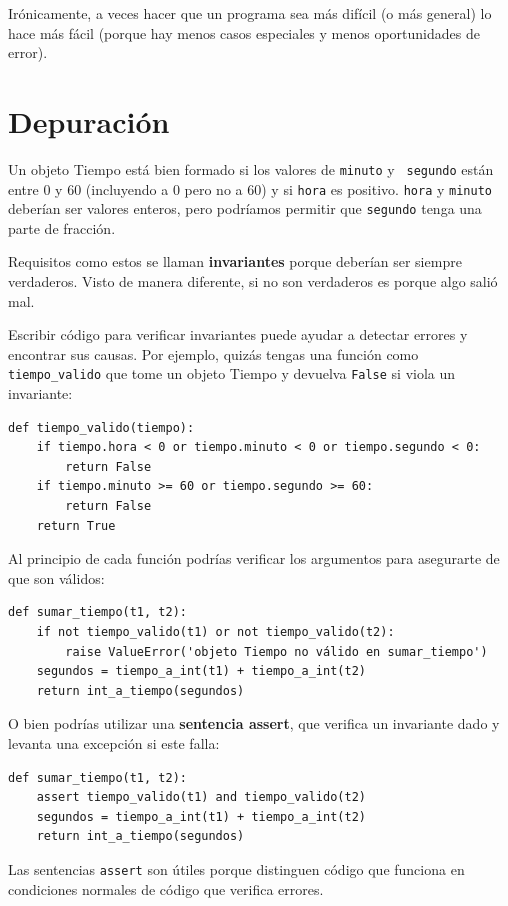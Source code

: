 \documentclass[10pt]{book}
\begin{document}
Irónicamente, a veces hacer que un programa sea más difícil (o más general) lo hace
más fácil (porque hay menos casos especiales y menos oportunidades
de error).


\section{Depuración}

Un objeto Tiempo está bien formado si los valores de {\tt minuto} y {\tt
segundo} están entre 0 y 60 (incluyendo a 0 pero no a 60) y si
{\tt hora} es positivo.  {\tt hora} y {\tt minuto} deberían ser
valores enteros, pero podríamos permitir que {\tt segundo} tenga una
parte de fracción.

Requisitos como estos se llaman {\bf invariantes} porque
deberían ser siempre verdaderos.  Visto de manera diferente, si no
son verdaderos es porque algo salió mal.

Escribir código para verificar invariantes puede ayudar a detectar errores
y encontrar sus causas.  Por ejemplo, quizás tengas una función
como \verb"tiempo_valido" que tome un objeto Tiempo y devuelva
{\tt False} si viola un invariante:

\begin{verbatim}
def tiempo_valido(tiempo):
    if tiempo.hora < 0 or tiempo.minuto < 0 or tiempo.segundo < 0:
        return False
    if tiempo.minuto >= 60 or tiempo.segundo >= 60:
        return False
    return True
\end{verbatim}
%
Al principio de cada función podrías verificar los
argumentos para asegurarte de que son válidos:

\begin{verbatim}
def sumar_tiempo(t1, t2):
    if not tiempo_valido(t1) or not tiempo_valido(t2):
        raise ValueError('objeto Tiempo no válido en sumar_tiempo')
    segundos = tiempo_a_int(t1) + tiempo_a_int(t2)
    return int_a_tiempo(segundos)
\end{verbatim}
%
O bien podrías utilizar una {\bf sentencia assert}, que verifica un invariante dado
y levanta una excepción si este falla:

\begin{verbatim}
def sumar_tiempo(t1, t2):
    assert tiempo_valido(t1) and tiempo_valido(t2)
    segundos = tiempo_a_int(t1) + tiempo_a_int(t2)
    return int_a_tiempo(segundos)
\end{verbatim}
%
Las sentencias {\tt assert} son útiles porque distinguen
código que funciona en condiciones normales de código
que verifica errores.
\end{document}
